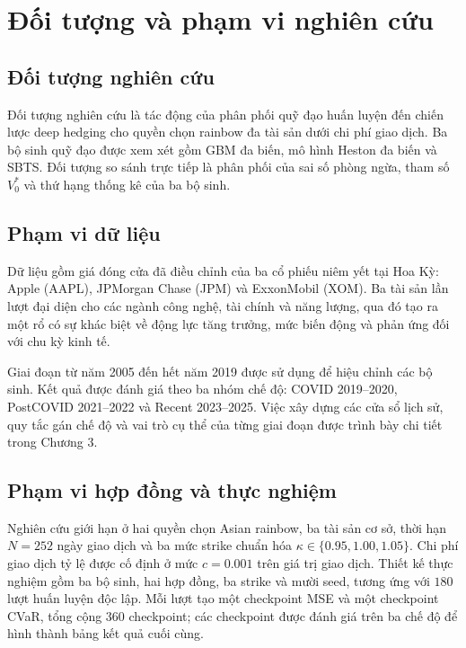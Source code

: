 \section{Đối tượng và phạm vi nghiên cứu}
\label{sec:doi-tuong-pham-vi}

\subsection{Đối tượng nghiên cứu}

Đối tượng nghiên cứu là tác động của phân phối quỹ đạo huấn luyện đến chiến
lược deep hedging cho quyền chọn rainbow đa tài sản dưới chi phí giao dịch.
Ba bộ sinh quỹ đạo được xem xét gồm \textsc{GBM} đa biến, mô hình Heston đa
biến và \textsc{SBTS}. Đối tượng so sánh trực tiếp là phân phối của sai số
phòng ngừa, tham số $V_0^{*}$ và thứ hạng thống kê của ba bộ sinh.

\subsection{Phạm vi dữ liệu}

Dữ liệu gồm giá đóng cửa đã điều chỉnh của ba cổ phiếu niêm yết tại Hoa Kỳ:
Apple (AAPL), JPMorgan Chase (JPM) và ExxonMobil (XOM). Ba tài sản lần lượt
đại diện cho các ngành công nghệ, tài chính và năng lượng, qua đó tạo ra một
rổ có sự khác biệt về động lực tăng trưởng, mức biến động và phản ứng đối với
chu kỳ kinh tế.

Giai đoạn từ năm 2005 đến hết năm 2019 được sử dụng để hiệu chỉnh các bộ sinh.
Kết quả được đánh giá theo ba nhóm chế độ: COVID 2019--2020, PostCOVID
2021--2022 và Recent 2023--2025. Việc xây dựng các cửa sổ lịch sử, quy tắc gán
chế độ và vai trò cụ thể của từng giai đoạn được trình bày chi tiết trong
Chương 3.

\subsection{Phạm vi hợp đồng và thực nghiệm}

Nghiên cứu giới hạn ở hai quyền chọn Asian rainbow, ba tài sản cơ sở, thời hạn
$N=252$ ngày giao dịch và ba mức strike chuẩn hóa
$\kappa\in\{0.95,1.00,1.05\}$. Chi phí giao dịch tỷ lệ được cố định ở mức
$c=0.001$ trên giá trị giao dịch. Thiết kế thực nghiệm gồm ba bộ sinh, hai hợp
đồng, ba strike và mười seed, tương ứng với $180$ lượt huấn luyện độc lập. Mỗi
lượt tạo một checkpoint MSE và một checkpoint CVaR, tổng cộng $360$
checkpoint; các checkpoint được đánh giá trên ba chế độ để hình thành bảng
kết quả cuối cùng.

